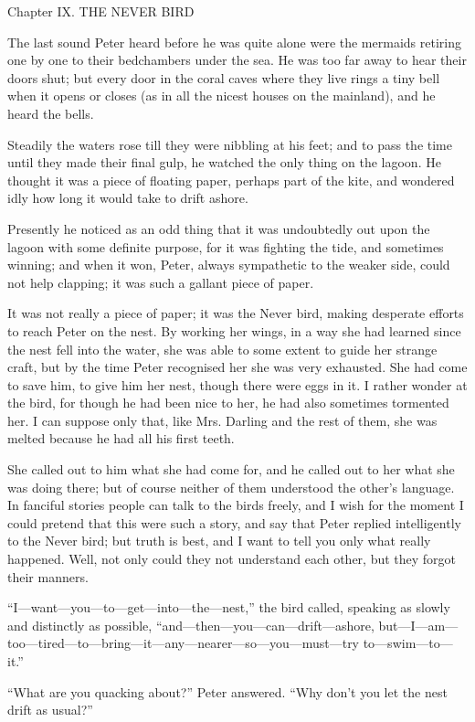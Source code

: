 Chapter IX.
THE NEVER BIRD


The last sound Peter heard before he was quite alone were the mermaids
retiring one by one to their bedchambers under the sea. He was too far
away to hear their doors shut; but every door in the coral caves where
they live rings a tiny bell when it opens or closes (as in all the
nicest houses on the mainland), and he heard the bells.

Steadily the waters rose till they were nibbling at his feet; and to
pass the time until they made their final gulp, he watched the only
thing on the lagoon. He thought it was a piece of floating paper,
perhaps part of the kite, and wondered idly how long it would take to
drift ashore.

Presently he noticed as an odd thing that it was undoubtedly out upon
the lagoon with some definite purpose, for it was fighting the tide,
and sometimes winning; and when it won, Peter, always sympathetic to
the weaker side, could not help clapping; it was such a gallant piece
of paper.

It was not really a piece of paper; it was the Never bird, making
desperate efforts to reach Peter on the nest. By working her wings, in
a way she had learned since the nest fell into the water, she was able
to some extent to guide her strange craft, but by the time Peter
recognised her she was very exhausted. She had come to save him, to
give him her nest, though there were eggs in it. I rather wonder at the
bird, for though he had been nice to her, he had also sometimes
tormented her. I can suppose only that, like Mrs. Darling and the rest
of them, she was melted because he had all his first teeth.

She called out to him what she had come for, and he called out to her
what she was doing there; but of course neither of them understood the
other's language. In fanciful stories people can talk to the birds
freely, and I wish for the moment I could pretend that this were such a
story, and say that Peter replied intelligently to the Never bird; but
truth is best, and I want to tell you only what really happened. Well,
not only could they not understand each other, but they forgot their
manners.

``I---want—you—to—get—into—the—nest,'' the bird called, speaking as slowly
and distinctly as possible, ``and---then—you—can—drift—ashore,
but---I—am—too—tired—to—bring—it—any—nearer—so—you—must—try
to---swim—to—it.''

``What are you quacking about?'' Peter answered. ``Why don't you let the
nest drift as usual?''

